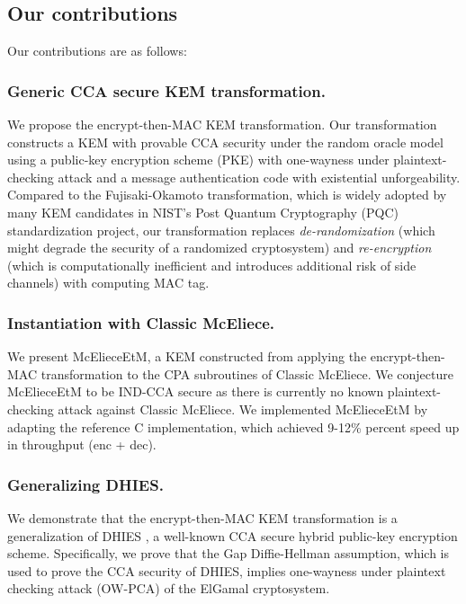\documentclass[runningheads]{llncs}
\begin{document}
\subsection{Our contributions}\label{sec:our-contributions}
Our contributions are as follows:

\subsubsection{Generic CCA secure KEM transformation.} We propose the encrypt-then-MAC KEM transformation. Our transformation constructs a KEM with provable CCA security under the random oracle model using a public-key encryption scheme (PKE) with one-wayness under plaintext-checking attack and a message authentication code with existential unforgeability. Compared to the Fujisaki-Okamoto transformation, which is widely adopted by many KEM candidates in NIST's Post Quantum Cryptography (PQC) standardization project, our transformation replaces \textit{de-randomization} (which might degrade the security of a randomized cryptosystem) and \textit{re-encryption} (which is computationally inefficient and introduces additional risk of side channels) with computing MAC tag.

\subsubsection{Instantiation with Classic McEliece.} We present McElieceEtM, a KEM constructed from applying the encrypt-then-MAC transformation to the CPA subroutines of Classic McEliece. We conjecture McElieceEtM to be IND-CCA secure as there is currently no known plaintext-checking attack against Classic McEliece. We implemented McElieceEtM by adapting the reference C implementation, which achieved 9-12\% percent speed up in throughput (enc + dec).

\subsubsection{Generalizing DHIES.} We demonstrate that the encrypt-then-MAC KEM transformation is a generalization of DHIES \cite{DBLP:conf/ctrsa/AbdallaBR01,DBLP:journals/iacr/AbdallaBR99}, a well-known CCA secure hybrid public-key encryption scheme. Specifically, we prove that the Gap Diffie-Hellman assumption, which is used to prove the CCA security of DHIES, implies one-wayness under plaintext checking attack (OW-PCA) of the ElGamal cryptosystem.

\end{document}
